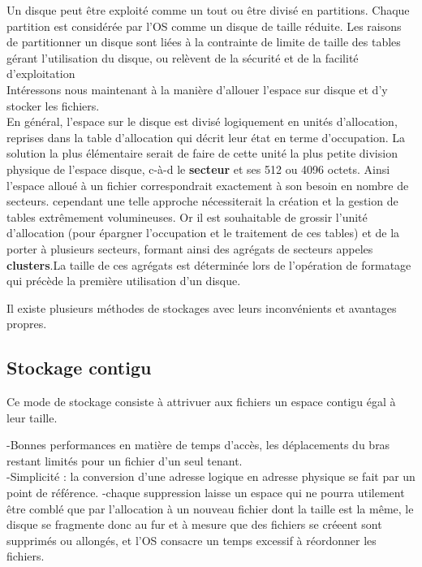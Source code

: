 \documentclass{report}
\begin{document}
Un disque peut être exploité comme un tout ou être divisé en partitions. Chaque partition est considérée par l'OS comme un disque de taille réduite. Les raisons de partitionner un disque sont liées à la contrainte de limite de taille des tables gérant l'utilisation du disque, ou relèvent de la sécurité et de la facilité d'exploitation\\

Intéressons nous maintenant à la manière d'allouer l'espace sur disque et d'y stocker les fichiers.\\
En général, l'espace sur le disque est divisé logiquement en unités d'allocation, reprises dans la table d'allocation qui décrit leur état en terme d'occupation. La solution la plus élémentaire serait de faire de cette unité la plus petite division physique de l'espace disque, c-à-d le {\bf secteur} et ses 512  ou 4096 octets. Ainsi l'espace alloué à un fichier correspondrait exactement à son besoin en nombre de secteurs. cependant une telle approche nécessiterait la création et la gestion de tables extrêmement volumineuses. Or il est souhaitable de grossir l'unité d'allocation (pour épargner l'occupation et le traitement de ces tables) et de la porter à plusieurs secteurs, formant ainsi des agrégats de secteurs appeles {\bf clusters}.La taille de ces agrégats est déterminée lors de l'opération de formatage qui précède la première utilisation d'un disque.

Il existe plusieurs méthodes de stockages avec leurs inconvénients et avantages propres.\\

\subsection{Stockage contigu}

Ce mode de stockage consiste à attrivuer aux fichiers un espace contigu égal à leur taille.

{\color{green}
-Bonnes performances en matière de temps d'accès, les déplacements du bras restant limités pour un fichier d'un seul tenant.\\
-Simplicité : la conversion d'une adresse logique en adresse physique se fait par un point de référence.}
{\color{red} -chaque suppression laisse un espace qui ne pourra utilement être comblé que par l'allocation à un nouveau fichier dont la taille est la même, le disque se fragmente donc au fur et à mesure que des fichiers se créeent sont supprimés ou allongés, et l'OS consacre un temps excessif à réordonner les fichiers}.\\
\end{document}
